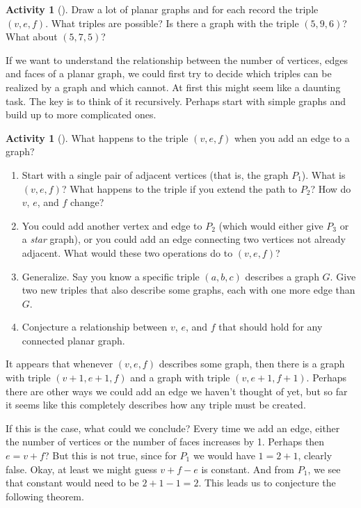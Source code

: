 \documentclass[10pt,]{book}
\theoremstyle{plain}
\theoremstyle{definition}
\theoremstyle{definition}
\theoremstyle{definition}
\newtheorem{activity}[project]{Activity}
\numberwithin{equation}{chapter}
\begin{document}
\begin{activity}[]\label{activity-280}
\hypertarget{p-1459}{}%
Draw a lot of planar graphs and for each record the triple \((v,e,f)\).  What triples are possible? Is there a graph with the triple \((5, 9, 6)\)?  What about \((5,7,5)\)?%
\end{activity}
\hypertarget{p-1460}{}%
If we want to understand the relationship between the number of vertices, edges and faces of a planar graph, we could first try to decide which triples can be realized by a graph and which cannot.  At first this might seem like a daunting task.  The key is to think of it recursively.  Perhaps start with simple graphs and build up to more complicated ones.%
\begin{activity}[]\label{activity-281}
\hypertarget{p-1461}{}%
What happens to the triple \((v,e,f)\) when you add an edge to a graph?%
\begin{enumerate}[font=\bfseries,label=(\alph*),ref=\alph*]
\item\label{task-242} \hypertarget{p-1462}{}%
Start with a single pair of adjacent vertices (that is, the graph \(P_1\)).  What is \((v,e,f)\)?  What happens to the triple if you extend the path to \(P_2\)?  How do \(v\), \(e\), and \(f\) change?%
\item\label{task-243} \hypertarget{p-1463}{}%
You could add another vertex and edge to \(P_2\) (which would either give \(P_3\) or a \emph{star} graph), or you could add an edge connecting two vertices not already adjacent.  What would these two operations do to \((v,e,f)\)?%
\item\label{task-244} \hypertarget{p-1464}{}%
Generalize.  Say you know a specific triple \((a,b,c)\) describes a graph \(G\).  Give two new triples that also describe some graphs, each with one more edge than \(G\).%
\item\label{task-245} \hypertarget{p-1465}{}%
Conjecture a relationship between \(v\), \(e\), and \(f\) that should hold for any connected planar graph.%
\end{enumerate}
\end{activity}
\hypertarget{p-1466}{}%
It appears that whenever \((v,e,f)\) describes some graph, then there is a graph with triple \((v+1, e+1, f)\) and a graph with triple \((v,e+1, f+1)\).  Perhaps there are other ways we could add an edge we haven't thought of yet, but so far it seems like this completely describes how any triple must be created.%
\par
\hypertarget{p-1467}{}%
If this is the case, what could we conclude?  Every time we add an edge, either the number of vertices or the number of faces increases by 1.  Perhaps then \(e = v + f\)?  But this is not true, since for \(P_1\) we would have \(1 = 2 + 1\), clearly false.  Okay, at least we might guess \(v + f - e\) is constant.  And from \(P_1\), we see that constant would need to be \(2 + 1 - 1 = 2\).  This leads us to conjecture the following theorem.%
\end{document}
